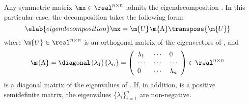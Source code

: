 Any symmetric matrix $\mx \in \real^{n \times n}$ admits the eigendecomposition
\cite{press2007}. In this particular case, the decomposition takes the following
form:
\begin{equation} \elab{eigendecomposition}
  \mx = \m{U} \m{\Lambda} \transpose{\m{U}}
\end{equation}
where $\m{U} \in \real^{n \times n}$ is an orthogonal matrix of the eigenvectors
of \mx, and
\[
  \m{\Lambda} = \diagonal{\lambda_1}{\lambda_n} = \left(
    \begin{array}{lll}
      \lambda_1 & \cdots & 0         \\
      \cdots    & \cdots & \cdots    \\
      0         & \cdots & \lambda_n
    \end{array}
  \right) \in \real^{n \times n}
\]
is a diagonal matrix of the eigenvalues of \mx. If, in addition, \mx is a
positive semidefinite matrix, the eigenvalues $\{ \lambda_i \}_{i = 1}^n$ are
non-negative.
